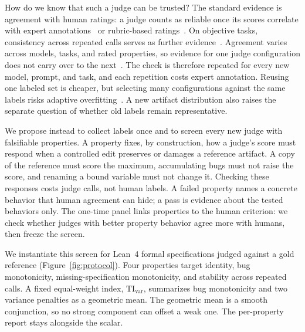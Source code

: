 How do we know that such a judge can be trusted?
The standard evidence is agreement with human ratings: a judge counts as reliable once its scores correlate with expert annotations~\citep{chen2026reform} or rubric-based ratings~\citep{Liu2023GEval,Zheng2023MTBench}.
On objective tasks, consistency across repeated calls serves as further evidence~\citep{Li2024TrustLLMJudgments}.
Agreement varies across models, tasks, and rated properties, so evidence for one judge configuration does not carry over to the next~\citep{Kocmi2024HumanVsLLM}.
The check is therefore repeated for every new model, prompt, and task, and each repetition costs expert annotation.
Reusing one labeled set is cheaper, but selecting many configurations against the same labels risks adaptive overfitting~\citep{dwork2015reusableholdout}.
A new artifact distribution also raises the separate question of whether old labels remain representative.

We propose instead to collect labels once and to screen every new judge with falsifiable properties.
A property fixes, by construction, how a judge's score must respond when a controlled edit preserves or damages a reference artifact.
A copy of the reference must score the maximum, accumulating bugs must not raise the score, and renaming a bound variable must not change it.
Checking these responses costs judge calls, not human labels.
A failed property names a concrete behavior that human agreement can hide; a pass is evidence about the tested behaviors only.
The one-time panel links properties to the human criterion: we check whether judges with better property behavior agree more with humans, then freeze the screen.

We instantiate this screen for Lean~4 formal specifications judged against a gold reference (Figure~\ref{fig:protocol}).
Four properties target identity, bug monotonicity, missing-specification monotonicity, and stability across repeated calls.
A fixed equal-weight index, $\mathrm{TI}_{\mathrm{var}}$, summarizes bug monotonicity and two variance penalties as a geometric mean.
The geometric mean is a smooth conjunction, so no strong component can offset a weak one.
The per-property report stays alongside the scalar.

